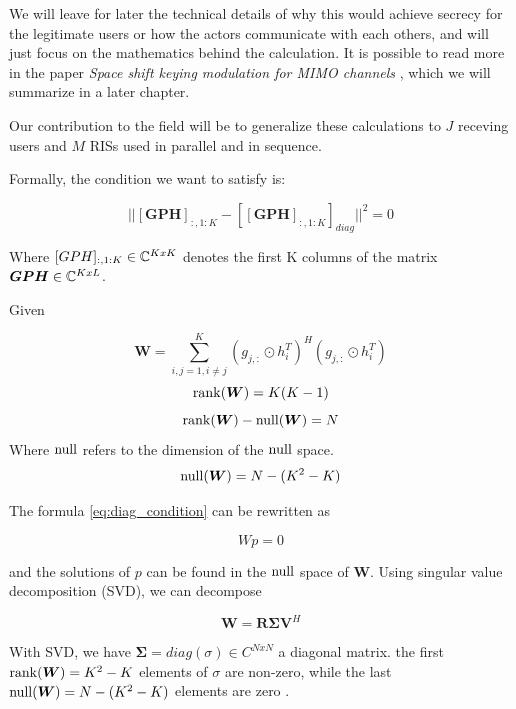 We will leave for later the technical details of why this would achieve secrecy for the legitimate users or how the actors communicate with each others, and will just focus on the mathematics behind the calculation. It is possible to read more in the paper \textit{Space shift keying modulation for MIMO channels} \cite{5165332}, which we will summarize in a later chapter.

Our contribution to the field will be to generalize these calculations to $J$ receving users and $M$ RISs used in parallel and in sequence.

Formally, the condition we want to satisfy is:

\begin{equation}
  || [\bm{GPH}]_{:,1:K} - [[\bm{GPH}]_{:,1:K}]_{diag} || ^2 = 0
  \label{eq:diag_condition}
\end{equation}

Where $[GPH]_{:,1:K} \in \mathbb{C}^{KxK}$ denotes the first K columns of the matrix $\bm{GPH} \in \mathbb{C}^{KxL}$.

Given

\begin{equation}
  \bm{W} = \sum_{i,j = 1, i \ne j}^{K} (g_{j,:} \odot h_i^T)^H (g_{j,:} \odot h_i^T)
\end{equation}
\begin{equation}
  \operatorname{rank}(\bm{W}) = K(K-1)
\end{equation}
\begin{equation}
  \operatorname{rank}(\bm{W}) - \operatorname{null}(\bm{W}) = N
\end{equation}
Where $\operatorname{null}$ refers to the dimension of the $\operatorname{null}$ space.
\begin{equation}
  \operatorname{null}(\bm{W}) = N - (K^2 - K)
\end{equation}

The formula \eqref{eq:diag_condition} can be rewritten as

\begin{equation}Wp = 0\end{equation}

and the solutions of $p$ can be found in the $\operatorname{null}$ space of $\bm{W}$. Using singular value decomposition (SVD), we can decompose

\begin{equation}
  \bm{W} = \bm{R \Sigma V}^H
\end{equation}

With SVD, we have $\bm{\Sigma} = diag(\sigma) \in C^{NxN}$ a diagonal matrix. the first $\operatorname{rank}(\bm{W}) = K^2-K$ elements of $\sigma$ are non-zero, while the last $\operatorname{null}(\bm{W}) = N - (K^2-K)$ elements are zero \cite{svd}.

